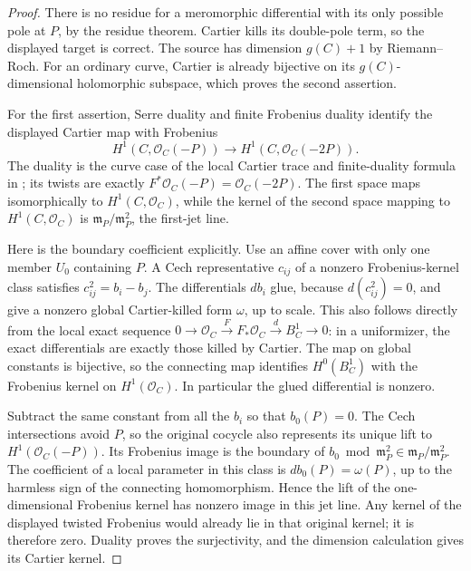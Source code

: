 \begin{proof}
There is no residue for a meromorphic differential with its only
possible pole at $P$, by the residue theorem. Cartier kills its
double-pole term, so the displayed target is correct.
The source has dimension $g(C)+1$ by Riemann--Roch.
For an ordinary curve, Cartier is already bijective on its
$g(C)$-dimensional holomorphic subspace, which proves the second
assertion.

For the first assertion, Serre duality and finite Frobenius
duality identify the displayed Cartier map with Frobenius
\[
 H^1(C,\mathcal O_C(-P))\longrightarrow
 H^1(C,\mathcal O_C(-2P)).
\]
The duality is the curve case of the local Cartier trace and
finite-duality formula in
\cite[Lemma~1.3.6 and Proposition~1.3.7, pp.~26--27]{BrionKumar2005};
its twists are exactly $F^*\mathcal O_C(-P)=\mathcal O_C(-2P)$.
The first space maps isomorphically to $H^1(C,\mathcal O_C)$,
while the kernel of the second space mapping to
$H^1(C,\mathcal O_C)$ is
$\mathfrak m_P/\mathfrak m_P^2$, the first-jet line.

Here is the boundary coefficient explicitly. Use an affine cover
with only one member $U_0$ containing $P$. A Cech representative
$c_{ij}$ of a nonzero Frobenius-kernel class satisfies
$c_{ij}^2=b_i-b_j$. The differentials $db_i$ glue, because
$d(c_{ij}^2)=0$, and give a nonzero global Cartier-killed
form $\omega$, up to scale. This also follows directly from
the local exact sequence
$0\to\mathcal O_C\xrightarrow{F}F_*\mathcal O_C
\xrightarrow{d} B^1_C\to0$: in a uniformizer, the exact
differentials are exactly those killed by Cartier.
The map on global constants is bijective, so the connecting
map identifies $H^0(B^1_C)$ with the Frobenius kernel on
$H^1(\mathcal O_C)$. In particular the glued differential is
nonzero.

Subtract the same constant from all the $b_i$ so that $b_0(P)=0$.
The Cech intersections avoid $P$, so the original cocycle also
represents its unique lift to $H^1(\mathcal O_C(-P))$.
Its Frobenius image is the boundary of
$b_0\bmod\mathfrak m_P^2\in\mathfrak m_P/\mathfrak m_P^2$.
The coefficient of a local parameter in this class is
$db_0(P)=\omega(P)$, up to the harmless sign of the connecting
homomorphism. Hence the lift of the one-dimensional Frobenius
kernel has nonzero image in this jet line. Any kernel of the
displayed twisted Frobenius would already lie in that original
kernel; it is therefore zero. Duality proves the surjectivity,
and the dimension calculation gives its Cartier kernel.
\end{proof}

